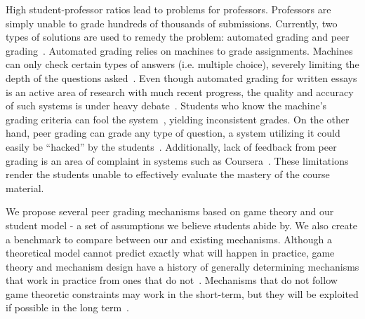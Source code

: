 \documentclass{chi-ext}
\begin{document}
High student-professor ratios lead to problems for professors. Professors are simply unable to grade hundreds of thousands of submissions. Currently, two types of solutions are used to remedy the problem: automated grading and peer grading~\cite{edxsoftware}. Automated grading relies on machines to grade assignments. Machines can only check certain types of answers (i.e. multiple choice), severely limiting the depth of the questions asked~\cite{rightandwrongMOOCs}. Even though automated grading for written essays is an active area of research with much recent progress, the quality and accuracy of such systems is under heavy debate~\cite{automatedsystemssuck}. Students who know the machine's grading criteria can fool the system~\cite{robogradingproblems}, yielding inconsistent grades.  On the other hand, peer grading can grade any type of question, a system utilizing it could easily be ``hacked'' by the students~\cite{makingsenseofMOOCs}. Additionally, lack of feedback from peer grading is an area of complaint in systems such as Coursera~\cite{howaccurateispeergrading}. These limitations render the students unable to effectively evaluate the mastery of the course material. 

We propose several peer grading mechanisms based on game theory and our student model - a set of assumptions we believe students abide by. We also create a benchmark to compare between our and existing mechanisms. Although a theoretical model cannot predict exactly what will happen in practice, game theory and mechanism design have a history of generally determining mechanisms that work in practice from ones that do not~\cite{AGTbook}. Mechanisms that do not follow game theoretic constraints may work in the short-term, but they will be exploited if possible in the long term~\cite{boycottfinal}.
\end{document}
